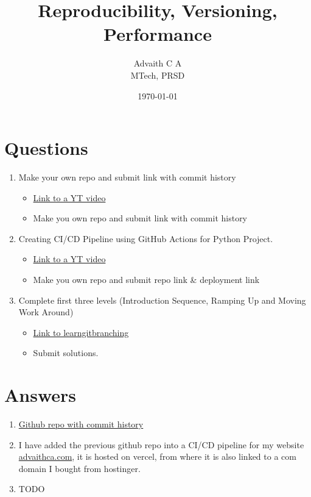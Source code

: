 \documentclass{article}
\title{Reproducibility, Versioning, Performance}
\author{Advaith C A \\MTech, PRSD}
\date{\today}
\begin{document}
    \maketitle
    \section*{Questions}
    \begin{enumerate}
        \item Make your own repo and submit link with commit history
        \begin{itemize}
            \item \href{https://www.youtube.com/watch?v=8Dd7KRpKeaE}{Link to a YT video}
            \item Make you own repo and submit link with commit history
        \end{itemize}
        \item Creating CI/CD Pipeline using GitHub Actions for Python Project.
        \begin{itemize}
            \item \href{https://www.youtube.com/watch?v=WTofttoD2xg}{Link to a YT video}
            \item Make you own repo and submit repo link \& deployment link
        \end{itemize}
        \item Complete first three levels (Introduction Sequence, Ramping Up and Moving Work Around)
        \begin{itemize}
            \item \href{https://learngitbranching.js.org/}{Link to learngitbranching}
            \item Submit solutions.
        \end{itemize}
    \end{enumerate}

    \section*{Answers}
    \begin{enumerate}
        \item \href{https://github.com/advaithca/advaithca.github.io/tree/master}{Github repo with commit history}
        \item I have added the previous github repo into a CI/CD pipeline for my website \href{https://advaithca.com}{advaithca.com}, it is hosted on vercel, from where it is also linked to a com domain I bought from hostinger.
        \item TODO
    \end{enumerate}
\end{document}
